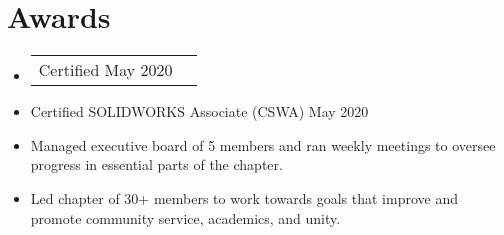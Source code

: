 \documentclass[letterpaper,11pt]{article}
\makeatletter
\newcommand{\resumeAward}[2]{
  \item
    \begin{tabular*}{1.0\textwidth}[t]{l@{\extracolsep{\fill}}r}
      {#1 #2}
    \end{tabular*}\vspace{-7pt}
}
\newcommand{\resumeItem}[1]{
  \item\small{
    {#1 \vspace{-2pt}}
  }
}
\newcommand{\resumeItemListStart}{\begin{itemize}}
\newcommand{\resumeItemListEnd}{\end{itemize}\vspace{-5pt}}
\makeatother
\begin{document}
\section{Awards}
    \resumeItemListStart
        \resumeAward{Certified}{May 2020}
        \resumeItem{Certified SOLIDWORKS Associate (CSWA)}{May 2020}
        \resumeItem{Managed executive board of 5 members and ran weekly meetings to oversee progress in essential parts of the chapter.}
        \resumeItem{Led chapter of 30+ members to work towards goals that improve and promote community service, academics, and unity.}
    \resumeItemListEnd
\end{document}
